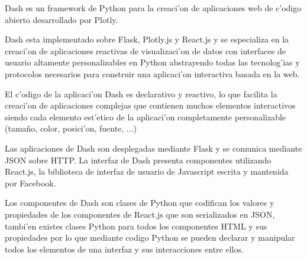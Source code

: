 Dash es un framework de Python para la creaci'on de aplicaciones web de c'odigo abierto desarrollado por Plotly.

Dash esta implementado sobre Flask, Plotly.js y React.js y se especializa en la creaci'on de aplicaciones reactivas de visualizaci'on de datos con interfaces de usuario altamente personalizables en Python abstrayendo todas las tecnolog'ias y protocolos necesarios para construir una aplicaci'on interactiva basada en la web.

El c'odigo de la aplicaci'on Dash es declarativo y reactivo, lo que facilita la creaci'on de aplicaciones complejas que contienen muchos elementos interactivos siendo cada elemento est'etico de la aplicaci'on completamente personalizable (tamaño, color, posici'on, fuente, ...)

Las aplicaciones de Dash son desplegadas mediante Flask y se comunica mediante JSON sobre HTTP. 
La interfaz de Dash presenta componentes utilizando React.js, la biblioteca de interfaz de usuario de Javascript escrita y mantenida por Facebook.

Los componentes de Dash son clases de Python que codifican los valores y propiedades de los componentes de React.js que son serializados en JSON, tambi'en existes clases Python para todos los componentes HTML y sus propiedades por lo que mediante codigo Python se pueden declarar y manipular todos los elementos de una interfaz y sus interacciones entre ellos.
